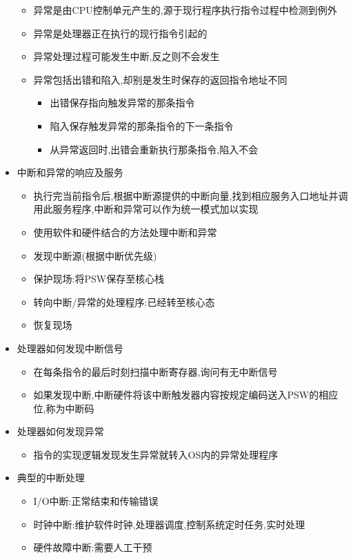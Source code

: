 \documentclass[a4paper,12pt,notitlepage]{article}
\begin{document}
\begin{itemize}
\begin{itemize}
		\item 异常是由CPU控制单元产生的,源于现行程序执行指令过程中检测到例外
		\item 异常是处理器正在执行的现行指令引起的
		\item 异常处理过程可能发生中断,反之则不会发生
		\item 异常包括出错和陷入,却别是发生时保存的返回指令地址不同
		\begin{itemize}
			\item 出错保存指向触发异常的那条指令
			\item 陷入保存触发异常的那条指令的下一条指令
			\item 从异常返回时,出错会重新执行那条指令,陷入不会
		\end{itemize}
	\end{itemize}
	\item 中断和异常的响应及服务
	\begin{itemize}
		\item 执行完当前指令后,根据中断源提供的中断向量,找到相应服务入口地址并调用此服务程序,中断和异常可以作为统一模式加以实现
		\item 使用软件和硬件结合的方法处理中断和异常
		\item 发现中断源(根据中断优先级)
		\item 保护现场:将PSW保存至核心栈
		\item 转向中断/异常的处理程序:已经转至核心态
		\item 恢复现场
	\end{itemize}
	\item 处理器如何发现中断信号
	\begin{itemize}
		\item 在每条指令的最后时刻扫描中断寄存器,询问有无中断信号
		\item 如果发现中断,中断硬件将该中断触发器内容按规定编码送入PSW的相应位,称为中断码
	\end{itemize}
	\item 处理器如何发现异常
	\begin{itemize}
		\item 指令的实现逻辑发现发生异常就转入OS内的异常处理程序
	\end{itemize}
	\item 典型的中断处理
	\begin{itemize}
		\item I/O中断:正常结束和传输错误
		\item 时钟中断:维护软件时钟,处理器调度,控制系统定时任务,实时处理
		\item 硬件故障中断:需要人工干预

\end{itemize}
\end{itemize}
\end{document}
